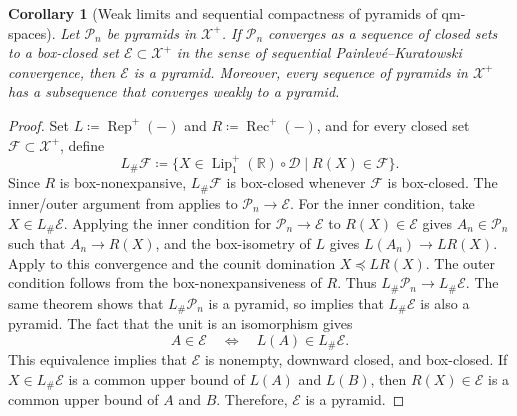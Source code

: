 \documentclass{amsart}
\theoremstyle{plain}
\newtheorem{corollary}[theorem]{Corollary}
\theoremstyle{definition}
\theoremstyle{remark}
\newcommand{\R}{\mathbb{R}}
\newcommand{\D}{\mathcal{D}}
\newcommand{\Xp}{\mathcal{X}^{+}}
\newcommand{\Lup}{\operatorname{Lip}^{+}_{1}(\R)}
\begin{document}
\begin{corollary}[Weak limits and sequential compactness of pyramids of qm-spaces]
\label{cor:pyramid-weak-limit-and-sequential-compactness}
Let $\mathcal P_n$ be pyramids in $\Xp$. If $\mathcal P_n$ converges as a sequence of closed sets to a box-closed set $\mathcal E\subset\Xp$ in the sense of sequential Painlev\'e--Kuratowski convergence, then $\mathcal E$ is a pyramid. Moreover, every sequence of pyramids in $\Xp$ has a subsequence that converges weakly to a pyramid.
\end{corollary}

\begin{proof}
Set $L\coloneqq\operatorname{Rep}^{+}(-)$ and $R\coloneqq\operatorname{Rec}^{+}(-)$, and for every closed set $\mathcal F\subset\Xp$, define
\[L_{\#}\mathcal F\coloneqq\{X\in\Lup\circ\D\mid R(X)\in\mathcal F\}.\]
Since $R$ is box-nonexpansive, $L_{\#}\mathcal F$ is box-closed whenever $\mathcal F$ is box-closed. The inner/outer argument from  applies to $\mathcal P_n\to\mathcal E$. For the inner condition, take $X\in L_{\#}\mathcal E$. Applying the inner condition for $\mathcal P_n\to\mathcal E$ to $R(X)\in\mathcal E$ gives $A_n\in\mathcal P_n$ such that $A_n\to R(X)$, and the box-isometry of $L$ gives $L(A_n)\to LR(X)$. Apply \cite[Lemma~5.4]{gds2} to this convergence and the counit domination $X\preceq LR(X)$. The outer condition follows from the box-nonexpansiveness of $R$. Thus $L_{\#}\mathcal P_n\to L_{\#}\mathcal E$. The same theorem shows that $L_{\#}\mathcal P_n$ is a pyramid, so  implies that $L_{\#}\mathcal E$ is also a pyramid. The fact that the unit is an isomorphism gives
\[A\in\mathcal E\quad\Longleftrightarrow\quad L(A)\in L_{\#}\mathcal E.\]
This equivalence implies that $\mathcal E$ is nonempty, downward closed, and box-closed. If $X\in L_{\#}\mathcal E$ is a common upper bound of $L(A)$ and $L(B)$, then $R(X)\in\mathcal E$ is a common upper bound of $A$ and $B$. Therefore, $\mathcal E$ is a pyramid.


\end{proof}
\end{document}
